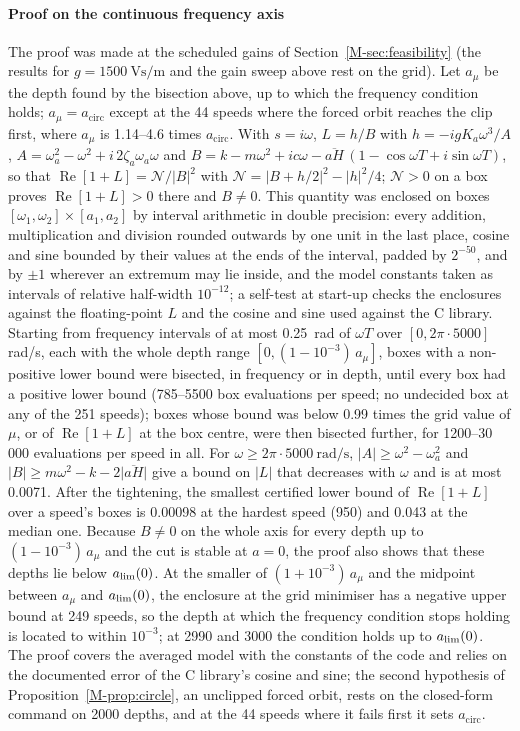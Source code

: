 \paragraph{Proof on the continuous frequency axis} The proof was made at the scheduled gains of Section~\ref{M-sec:feasibility} (the results for $g=\SI{1500}{\volt\second\per\metre}$ and the gain sweep above rest on the grid). Let $a_\mu$ be the depth found by the bisection above, up to which the frequency condition holds; $a_\mu=a_{\mathrm{circ}}$ except at the 44 speeds where the forced orbit reaches the clip first, where $a_\mu$ is 1.14--4.6 times $a_{\mathrm{circ}}$. With $s=i\omega$, $L=h/B$ with $h=-igK_a\omega^3/A$, $A=\omega_a^2-\omega^2+i\,2\zeta_a\omega_a\omega$ and $B=k-m\omega^2+ic\omega-\overline{aH}\,(1-\cos\omega T+i\sin\omega T)$, so that $\operatorname{Re}[1+L]=\mathcal N/\lvert B\rvert^2$ with $\mathcal N=\lvert B+h/2\rvert^2-\lvert h\rvert^2/4$; $\mathcal N>0$ on a box proves $\operatorname{Re}[1+L]>0$ there and $B\neq0$. This quantity was enclosed on boxes $[\omega_1,\omega_2]\times[a_1,a_2]$ by interval arithmetic in double precision: every addition, multiplication and division rounded outwards by one unit in the last place, cosine and sine bounded by their values at the ends of the interval, padded by $2^{-50}$, and by $\pm1$ wherever an extremum may lie inside, and the model constants taken as intervals of relative half-width $10^{-12}$; a self-test at start-up checks the enclosures against the floating-point $L$ and the cosine and sine used against the C library. Starting from frequency intervals of at most \SI{0.25}{\radian} of $\omega T$ over $[0,2\pi\cdot5000]$\,rad/s, each with the whole depth range $[0,(1-10^{-3})\,a_\mu]$, boxes with a non-positive lower bound were bisected, in frequency or in depth, until every box had a positive lower bound (785--5500 box evaluations per speed; no undecided box at any of the 251 speeds); boxes whose bound was below 0.99 times the grid value of $\mu$, or of $\operatorname{Re}[1+L]$ at the box centre, were then bisected further, for 1200--30\,000 evaluations per speed in all. For $\omega\ge2\pi\cdot\SI{5000}{\radian\per\second}$, $\lvert A\rvert\ge\omega^2-\omega_a^2$ and $\lvert B\rvert\ge m\omega^2-k-2\lvert\overline{aH}\rvert$ give a bound on $\lvert L\rvert$ that decreases with $\omega$ and is at most 0.0071. After the tightening, the smallest certified lower bound of $\operatorname{Re}[1+L]$ over a speed's boxes is 0.00098 at the hardest speed (\SI{950}{\rpm}) and 0.043 at the median one. Because $B\neq0$ on the whole axis for every depth up to $(1-10^{-3})\,a_\mu$ and the cut is stable at $a=0$, the proof also shows that these depths lie below $a_{\lim}(0)$. At the smaller of $(1+10^{-3})\,a_\mu$ and the midpoint between $a_\mu$ and $a_{\lim}(0)$, the enclosure at the grid minimiser has a negative upper bound at 249 speeds, so the depth at which the frequency condition stops holding is located to within $10^{-3}$; at 2990 and \SI{3000}{\rpm} the condition holds up to $a_{\lim}(0)$. The proof covers the averaged model with the constants of the code and relies on the documented error of the C library's cosine and sine; the second hypothesis of Proposition~\ref{M-prop:circle}, an unclipped forced orbit, rests on the closed-form command on 2000 depths, and at the 44 speeds where it fails first it sets $a_{\mathrm{circ}}$.
